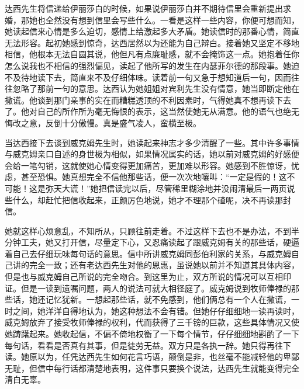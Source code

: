 \par 达西先生将信递给伊丽莎白的时候，如果说伊丽莎白并不期待信里会重新提出求婚，那她也全然没有想到信里会写些什么。一看是这样一些内容，你便可想而知，她读起信来心情是多么迫切，感情上给激起多大矛盾。她读信时的那番心情，简直无法形容。起初她感到惊奇，达西居然以为还能为自己辩白。接着她又坚定不移地相信，他根本无法自圆其说，他但凡有点廉耻感，就不会掩饰这一点。她抱着任你怎么说我也不相信的强烈偏见，读起了他所写的发生在内瑟菲尔德的那段事。她迫不及待地读下去，简直来不及仔细体味。读着前一句又急于想知道后一句，因而往往忽略了那前一句的意思。达西认为她姐姐对宾利先生没有情意，她当即断定他在撒谎。他谈到那门亲事的实在而糟糕透顶的不利因素时，气得她真不想再读下去了。他对自己的所作所为毫无悔恨的表示，这当然使她无从满意。他的语气也绝无悔改之意，反倒十分傲慢。真是盛气凌人，蛮横至极。
\par 当达西接下去谈到威克姆先生时，她读起来神志才多少清醒了一些。其中许多事情与威克姆亲口自述的身世极为相似，如果情况属实的话，她以前对威克姆的好感便会给一笔勾销，这就使她心情变得更加痛苦，更加难以形容。她感到不胜惊讶，忧虑，甚至恐惧。她真想完全不信他那些话，便一次次地嚷叫：“一定是假的！这不可能！这是弥天大谎！”她把信读完以后，尽管稀里糊涂地并没闹清最后一两页说些什么，却赶忙把信收起来，正颜厉色地说，她才不理那个碴呢，决不再读那封信。
\par 她就这样心烦意乱，不知所从，只顾往前走着。不过这样下去也不是办法，不到半分钟工夫，她又打开信，尽量定下心，又忍痛读起了跟威克姆有关的那些话，硬逼着自己去仔细玩味每句话的意思。信中所讲威克姆同彭伯利家的关系，与威克姆自己讲的完全一致；还有老达西先生对他的恩惠，虽说她以前并不知道其具体内容，但是也与威克姆自己所说的完全吻合。到这里为止，双方所说的情况可以互相印证。但是一读到遗嘱问题，两人的说法可就大相径庭了。威克姆说到牧师俸禄的那些话，她还记忆犹新。一想起那些话，就不免感到，他们俩总有一个人在撒谎，一时之间，她洋洋自得地认为，她这种想法不会有错。但她仔仔细细地一读再读时，威克姆放弃了接受牧师俸禄的权利，代而获得了三千镑的巨款，这些具体情况又使她踌躇起来。她收起信，不偏不倚地权衡了一下每个情节，仔仔细细地斟酌了一下每句话，看看是否真有其事，但是徒劳无益。双方只是各执一辞。她只得再往下读。她原以为，任凭达西先生如何花言巧语，颠倒是非，也丝毫不能减轻他的卑鄙无耻，但信中每行话都清楚地表明，这件事只要换个说法，达西先生就能变得完全清白无辜。
